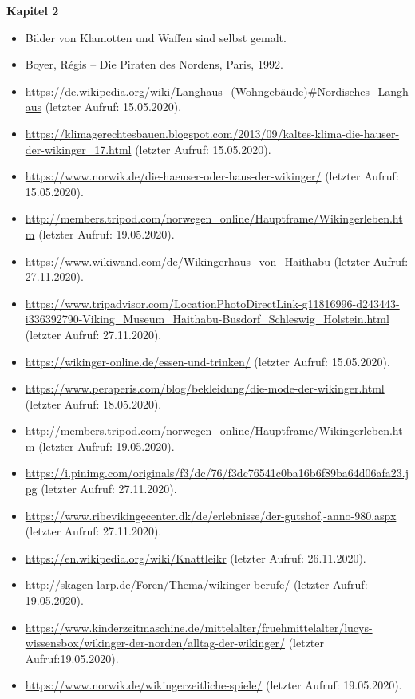 \documentclass[12pt,a4paper,ngerman,openany]{book}
\begin{document}
\textbf{Kapitel 2}
\begin{itemize}
  \item Bilder von Klamotten und Waffen sind selbst gemalt.
  \item Boyer, Régis – Die Piraten des Nordens, Paris, 1992.
  \item \url{https://de.wikipedia.org/wiki/Langhaus_(Wohngebäude)#Nordisches_Langhaus} (letzter Aufruf: 15.05.2020).
  \item \url{https://klimagerechtesbauen.blogspot.com/2013/09/kaltes-klima-die-hauser-der-wikinger_17.html} (letzter Aufruf: 15.05.2020).
  \item \url{https://www.norwik.de/die-haeuser-oder-haus-der-wikinger/} (letzter Aufruf: 15.05.2020).
  \item \url{http://members.tripod.com/norwegen_online/Hauptframe/Wikingerleben.htm} (letzter Aufruf: 19.05.2020).
  \item \url{https://www.wikiwand.com/de/Wikingerhaus_von_Haithabu} (letzter Aufruf: 27.11.2020).
  \item \url{https://www.tripadvisor.com/LocationPhotoDirectLink-g11816996-d243443-i336392790-Viking_Museum_Haithabu-Busdorf_Schleswig_Holstein.html} (letzter Aufruf: 27.11.2020).
  \item \url{https://wikinger-online.de/essen-und-trinken/} (letzter Aufruf: 15.05.2020).
  \item \url{https://www.peraperis.com/blog/bekleidung/die-mode-der-wikinger.html} (letzter Aufruf: 18.05.2020).
  \item \url{http://members.tripod.com/norwegen_online/Hauptframe/Wikingerleben.htm} (letzter Aufruf: 19.05.2020).
  \item \url{https://i.pinimg.com/originals/f3/dc/76/f3dc76541c0ba16b6f89ba64d06afa23.jpg} (letzter Aufruf: 27.11.2020).
  \item \url{https://www.ribevikingecenter.dk/de/erlebnisse/der-gutshof,-anno-980.aspx}  (letzter Aufruf: 27.11.2020).
  \item \url{https://en.wikipedia.org/wiki/Knattleikr} (letzter Aufruf: 26.11.2020).
  \item \url{http://skagen-larp.de/Foren/Thema/wikinger-berufe/} (letzter Aufruf: 19.05.2020).
  \item \url{https://www.kinderzeitmaschine.de/mittelalter/fruehmittelalter/lucys-wissensbox/wikinger-der-norden/alltag-der-wikinger/} (letzter Aufruf:19.05.2020).
  \item \url{https://www.norwik.de/wikingerzeitliche-spiele/} (letzter Aufruf: 19.05.2020).
\end{itemize}
\end{document}
